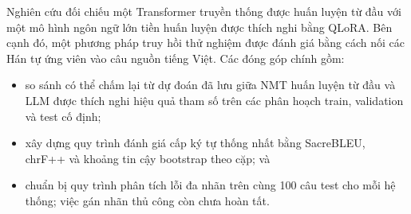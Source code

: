 \documentclass[11pt,twocolumn]{article}
\begin{document}
Nghiên cứu đối chiếu một Transformer truyền thống được huấn luyện từ đầu với một mô hình ngôn ngữ lớn tiền huấn luyện được thích nghi bằng QLoRA. Bên cạnh đó, một phương pháp truy hồi thử nghiệm được đánh giá bằng cách nối các Hán tự ứng viên vào câu nguồn tiếng Việt. Các đóng góp chính gồm:

\begin{itemize}
  \item so sánh có thể chấm lại từ dự đoán đã lưu giữa NMT huấn luyện từ đầu và LLM được
  thích nghi hiệu quả tham số trên các phân hoạch train, validation và test
  cố định;
  \item xây dựng quy trình đánh giá cấp ký tự thống nhất bằng SacreBLEU,
  chrF++ và khoảng tin cậy bootstrap theo cặp; và
  \item chuẩn bị quy trình phân tích lỗi đa nhãn trên cùng 100 câu test
  cho mỗi hệ thống; việc gán nhãn thủ công còn chưa hoàn tất.
\end{itemize}




\end{document}
